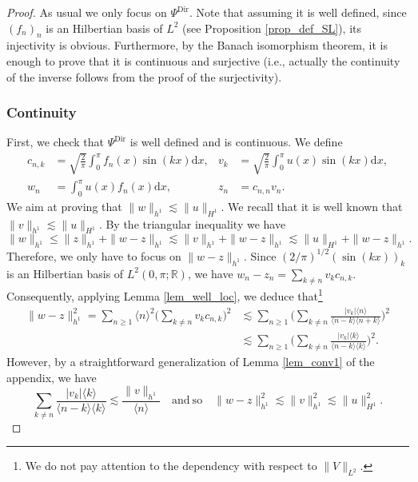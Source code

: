 \documentclass[11pt]{article}
\newcommand{\ie}{i.e.,\xspace}
\theoremstyle{definition}
\begin{document}
\begin{proof} As usual we only focus on $\Psi^{\mathrm{Dir}}$. Note that assuming it is well defined, since $(f_n)_n$ is an Hilbertian basis of $L^2$ (see Proposition \ref{prop_def_SL}), its injectivity is obvious. Furthermore, by the Banach isomorphism theorem, it is enough to prove that it is continuous and surjective (\ie actually the continuity of the inverse follows from the proof of the surjectivity).

\subsubsection*{Continuity}
First, we check that $\Psi^{\mathrm{Dir}}$ is well defined and is continuous.
We define
\begin{equation}\label{eq_plein_de_monde}
\begin{aligned}
c_{n,k} &= \sqrt{\frac{2}\pi} \int_0^\pi f_n(x) \sin(k x) \mathrm{d}x, & v_k &= \sqrt{\frac{2}\pi} \int_0^\pi u(x) \sin(k x) \mathrm{d}x,\\
w_n &= \int_0^\pi u(x) f_n(x) \mathrm{d}x, & z_n &= c_{n,n} v_n.
\end{aligned}
\end{equation}
We aim at proving that $\| w\|_{h^1} \lesssim \| u \|_{H^1}$. We recall that it is well known that $\| v \|_{h^1} \lesssim \| u\|_{H^1}$. By the triangular inequality we have
\[
\| w\|_{h^1} \leq \| z \|_{h^1} + \|w - z \|_{h^1} \lesssim \| v \|_{h^1} + \|w - z \|_{h^1} \lesssim \| u \|_{H^1} + \|w - z \|_{h^1}.
\]
Therefore, we only have to focus on $\|w - z \|_{h^1}$. Since $(2/\pi)^{1/2}(\sin(kx))_k$ is an Hilbertian basis of $L^2(0,\pi;\mathbb{R})$, we have $
w_n - z_n = \sum_{k\neq n} v_k c_{n,k}$.
Consequently, applying Lemma \ref{lem_well_loc}, we deduce that\footnote{We do not pay attention to the dependency with respect to $\|V\|_{L^2}$.}
\begin{equation*}
\begin{split}
\|w - z \|_{h^1}^2 = \sum_{n\geq 1} \langle n \rangle^2 \biggl(\sum_{k\neq n} v_k c_{n,k} \biggr)^2 &\lesssim \sum_{n\geq 1} \biggl(\sum_{k\neq n} \frac{|v_k| \langle n \rangle}{\langle n-k \rangle \langle n+k \rangle } \biggr)^2 \\ &\lesssim \sum_{n\geq 1} \biggl(\sum_{k\neq n} \frac{|v_k| \langle k \rangle}{\langle n-k \rangle \langle k \rangle } \biggr)^2.
\end{split}
\end{equation*}
However, by a straightforward generalization of Lemma \ref{lem_conv1} of the appendix, we have
\[
\sum_{k\neq n} \frac{|v_k| \langle k \rangle}{\langle n-k \rangle \langle k \rangle } \lesssim \frac{\| v\|_{h^1}}{\langle n\rangle} \quad \mathrm{and } \ \mathrm{so} \quad \|w - z \|_{h^1}^2\lesssim \| v\|_{h^1}^2 \lesssim \|u\|_{H^1}^2.
\]


\end{proof}
\end{document}
